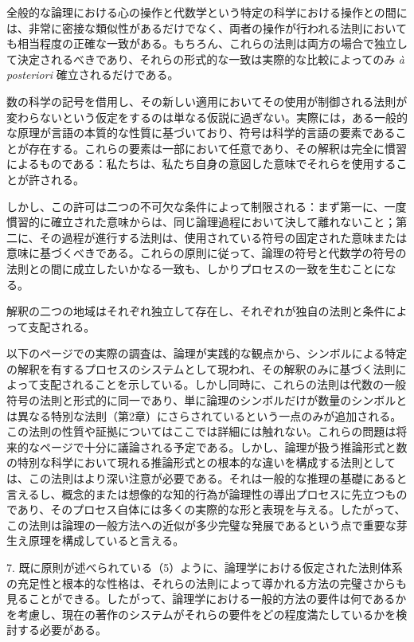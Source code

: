 \documentclass[a4paper,11pt,openany]{ltjsbook}
\begin{document}
全般的な論理における心の操作と代数学という特定の科学における操作との間には、非常に密接な類似性があるだけでなく、両者の操作が行われる法則においても相当程度の正確な一致がある。もちろん、これらの法則は両方の場合で独立して決定されるべきであり、それらの形式的な一致は実際的な比較によってのみ \textit{\`{a} posteriori} 確立されるだけである。

数の科学の記号を借用し、その新しい適用においてその使用が制御される法則が変わらないという仮定をするのは単なる仮説に過ぎない。実際には，ある一般的な原理が言語の本質的な性質に基づいており、符号は科学的言語の要素であることが存在する。これらの要素は一部において任意であり、その解釈は完全に慣習によるものである：私たちは、私たち自身の意図した意味でそれらを使用することが許される。

しかし、この許可は二つの不可欠な条件によって制限される：まず第一に、一度慣習的に確立された意味からは、同じ論理過程において決して離れないこと；第二に、その過程が進行する法則は、使用されている符号の固定された意味または意味に基づくべきである。これらの原則に従って、論理の符号と代数学の符号の法則との間に成立したいかなる一致も、しかりプロセスの一致を生むことになる。

解釈の二つの地域はそれぞれ独立して存在し、それぞれが独自の法則と条件によって支配される。

以下のページでの実際の調査は、論理が実践的な観点から、シンボルによる特定の解釈を有するプロセスのシステムとして現われ、その解釈のみに基づく法則によって支配されることを示している。しかし同時に、これらの法則は代数の一般符号の法則と形式的に同一であり、単に論理のシンボルだけが数量のシンボルとは異なる特別な法則（第2章）にさらされているという一点のみが追加される。この法則の性質や証拠についてはここでは詳細には触れない。これらの問題は将来的なページで十分に議論される予定である。しかし、論理が扱う推論形式と数の特別な科学において現れる推論形式との根本的な違いを構成する法則としては、この法則はより深い注意が必要である。それは一般的な推理の基礎にあると言えるし、概念的または想像的な知的行為が論理性の導出プロセスに先立つものであり、そのプロセス自体には多くの実際的な形と表現を与える。したがって、この法則は論理の一般方法への近似が多少完璧な発展であるという点で重要な芽生え原理を構成していると言える。

7. 既に原則が述べられている（5）ように、論理学における仮定された法則体系の充足性と根本的な性格は、それらの法則によって導かれる方法の完璧さからも見ることができる。したがって、論理学における一般的方法の要件は何であるかを考慮し、現在の著作のシステムがそれらの要件をどの程度満たしているかを検討する必要がある。
\end{document}
